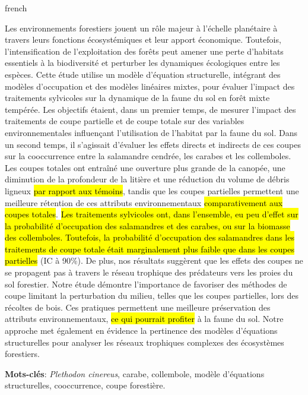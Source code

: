 \begin{otherlanguage*}{french}

Les environnements forestiers jouent un rôle majeur à l’échelle planétaire à travers leurs fonctions écosystémiques et leur apport économique. 
Toutefois, l'intensification de l'exploitation des forêts peut amener une perte d'habitats essentiels à la biodiversité et perturber les dynamiques écologiques entre les espèces. 
Cette étude utilise un modèle d'équation structurelle, intégrant des modèles d’occupation et des modèles linéaires mixtes, pour évaluer l’impact des traitements sylvicoles sur la dynamique de la faune du sol en forêt mixte tempérée. 
Les objectifs étaient, dans un premier temps, de mesurer l’impact des traitements de coupe partielle et de coupe totale sur des variables environnementales influençant l’utilisation de l’habitat par la faune du sol. 
Dans un second temps, il s'agissait d’évaluer les effets directs et indirects de ces coupes sur la cooccurrence entre la salamandre cendrée, les carabes et les collemboles.  
Les coupes totales ont entraîné une ouverture plus grande de la canopée, une diminution de la profondeur de la litière et une réduction du volume de débris ligneux \hl{par rapport aux témoins}, 
tandis que les coupes partielles permettent une meilleure rétention de ces attributs environnementaux \hl{comparativement aux coupes totales}. 
\hl{Les traitements sylvicoles ont, dans l’ensemble, eu peu d’effet sur la probabilité d’occupation des salamandres et des carabes, ou sur la biomasse des collemboles. 
Toutefois, la probabilité d’occupation des salamandres dans les traitements de coupe totale était marginalement plus faible que dans les coupes partielles} (IC à 90\%). 
De plus, nos résultats suggèrent que les effets des coupes ne se propagent pas à travers le réseau trophique des prédateurs vers les proies du sol forestier. 
Notre étude démontre l'importance de favoriser des méthodes de coupe limitant la perturbation du milieu, telles que les coupes partielles, lors des récoltes de bois. 
Ces pratiques permettent une meilleure préservation des attributs environnementaux, \hl{ce qui pourrait profiter} à la faune du sol. 
Notre approche met également en évidence la pertinence des modèles d’équations structurelles pour analyser les réseaux trophiques complexes des écosystèmes forestiers. 

\textbf{Mots-clés}: \textit{Plethodon cinereus}, carabe, collembole, modèle d'équations structurelles, cooccurrence, coupe forestière.
\end{otherlanguage*}

